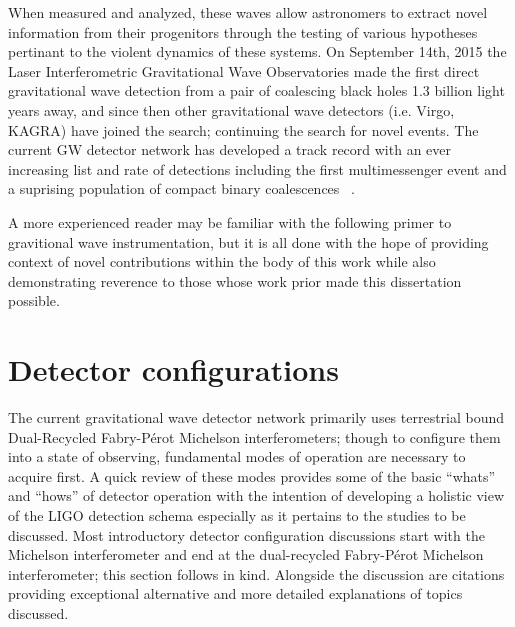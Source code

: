 When measured and analyzed, these waves allow astronomers to extract novel information from their progenitors through the testing of various hypotheses pertinant to the violent dynamics of these systems. On September 14th, 2015 the Laser Interferometric Gravitational Wave Observatories made the first direct gravitational wave detection from a pair of coalescing black holes 1.3 billion light years away, and since then other gravitational wave detectors (i.e. Virgo, KAGRA) have joined the search; continuing the search for novel events. The current GW detector network has developed a track record with an ever increasing list and rate of detections including the first multimessenger event and a suprising population of compact binary coalescences ~\cite{gw170817, nitz:2023}. 

A more experienced reader may be familiar with the following primer to gravitional wave instrumentation, but it is all done with the hope of providing context of novel contributions within the body of this work while also demonstrating reverence to those whose work prior made this dissertation possible. 

\section{Detector configurations}\label{sec:detcon}
The current gravitational wave detector network primarily uses terrestrial bound Dual-Recycled Fabry-P\'erot Michelson interferometers; though to configure them into a state of observing, fundamental modes of operation are necessary to acquire first. A quick review of these modes provides some of the basic ``whats'' and ``hows'' of detector operation with the intention of developing a holistic view of the LIGO detection schema especially as it pertains to the studies to be discussed. Most introductory detector configuration discussions start with the Michelson interferometer and end at the dual-recycled Fabry-P\'erot Michelson interferometer; this section follows in kind. Alongside the discussion are citations providing exceptional alternative and more detailed explanations of topics discussed.

